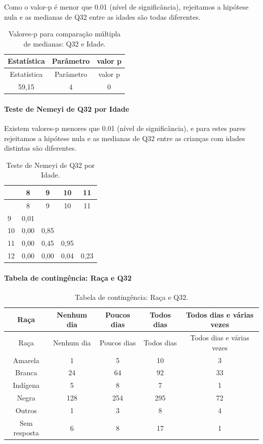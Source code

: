 \documentclass[]{article}
\let\oldparagraph\paragraph
\renewcommand{\paragraph}[1]{\oldparagraph{#1}\mbox{}}
\begin{document}
Como o valor-p é menor que 0.01 (nível de significância), rejeitamos a hipótese nula e as medianas de Q32 entre as idades são todas diferentes.

\begin{longtable}[]{@{}ccc@{}}
\caption{\label{tab:unnamed-chunk-1102}Valores-p para comparação múltipla de medianas: Q32 e Idade.}\tabularnewline
\toprule
Estatística & Parâmetro & valor p\tabularnewline
\midrule
\endfirsthead
\toprule
Estatística & Parâmetro & valor p\tabularnewline
\midrule
\endhead
59,15 & 4 & 0\tabularnewline
\bottomrule
\end{longtable}

\hypertarget{teste-de-nemeyi-de-q32-por-idade}{%
\paragraph{Teste de Nemeyi de Q32 por Idade}\label{teste-de-nemeyi-de-q32-por-idade}}

Existem valores-p menores que 0.01 (nível de significância), e para estes pares rejeitamos a hipótese nula e as medianas de Q32 entre as crianças com idades distintas são diferentes.

\begin{longtable}[]{@{}lcccc@{}}
\caption{\label{tab:unnamed-chunk-1104}Teste de Nemeyi de Q32 por Idade.}\tabularnewline
\toprule
& 8 & 9 & 10 & 11\tabularnewline
\midrule
\endfirsthead
\toprule
& 8 & 9 & 10 & 11\tabularnewline
\midrule
\endhead
9 & 0,01 & & &\tabularnewline
10 & 0,00 & 0,85 & &\tabularnewline
11 & 0,00 & 0,45 & 0,95 &\tabularnewline
12 & 0,00 & 0,00 & 0,04 & 0,23\tabularnewline
\bottomrule
\end{longtable}

\cleardoublepage

\hypertarget{tabela-de-continguxeancia-rauxe7a-e-q32}{%
\paragraph{Tabela de contingência: Raça e Q32}\label{tabela-de-continguxeancia-rauxe7a-e-q32}}

\begin{longtable}[]{@{}ccccc@{}}
\caption{\label{tab:unnamed-chunk-1105}Tabela de contingência: Raça e Q32.}\tabularnewline
\toprule
Raça & Nenhum dia & Poucos dias & Todos dias & Todos dias e várias vezes\tabularnewline
\midrule
\endfirsthead
\toprule
Raça & Nenhum dia & Poucos dias & Todos dias & Todos dias e várias vezes\tabularnewline
\midrule
\endhead
Amarela & 1 & 5 & 10 & 3\tabularnewline
Branca & 24 & 64 & 92 & 33\tabularnewline
Indígena & 5 & 8 & 7 & 1\tabularnewline
Negra & 128 & 254 & 295 & 72\tabularnewline
Outros & 1 & 3 & 8 & 4\tabularnewline
Sem resposta & 6 & 8 & 17 & 1\tabularnewline
\bottomrule
\end{longtable}
\end{document}
